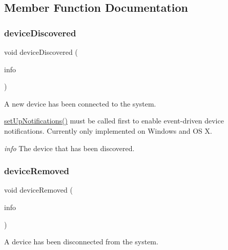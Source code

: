 \subsection{Member Function Documentation}
\mbox{\label{class_qext_serial_enumerator_a843e343100c56975330e84dc0f291830}} 
\subsubsection{\texorpdfstring{deviceDiscovered}{deviceDiscovered}}
{\footnotesize\ttfamily void device\+Discovered (\begin{DoxyParamCaption}\item[{const \mbox{\hyperlink{struct_qext_port_info}{Qext\+Port\+Info}} \&}]{info }\end{DoxyParamCaption})\hspace{0.3cm}{\ttfamily [signal]}}

A new device has been connected to the system.

\mbox{\hyperlink{class_qext_serial_enumerator_a8879197538e52cc9e4ad6a8902c50187}{set\+Up\+Notifications()}} must be called first to enable event-\/driven device notifications. Currently only implemented on Windows and OS X.

{\itshape info} The device that has been discovered. \mbox{\label{class_qext_serial_enumerator_a17bff0666e7ef9b812e165828b92938e}} 
\subsubsection{\texorpdfstring{deviceRemoved}{deviceRemoved}}
{\footnotesize\ttfamily void device\+Removed (\begin{DoxyParamCaption}\item[{const \mbox{\hyperlink{struct_qext_port_info}{Qext\+Port\+Info}} \&}]{info }\end{DoxyParamCaption})\hspace{0.3cm}{\ttfamily [signal]}}

A device has been disconnected from the system.

